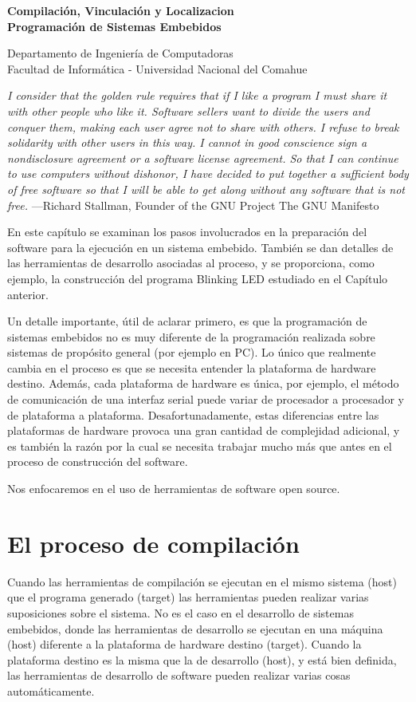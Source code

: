 \documentclass[12pt]{article}
\def\maketitle{

 \makeatletter
 {\color{bl} \centering \huge \sc \textbf{
 Compilación, Vinculación y Localizacion\\ 
\large \vspace*{-8pt} \color{black} Programación de Sistemas Embebidos
 \vspace*{8pt} }\par}
 \makeatother


 \makeatletter
 {\centering \small 
 	Departamento de Ingeniería de Computadoras \\
 	Facultad de Informática - Universidad Nacional del Comahue \\
 	\vspace{20pt} }
 \makeatother

}
\begin{document}
\thispagestyle{empty}
\maketitle
\setlength{\parindent}{0pt}

{\it I consider that the golden rule requires that if I like a program I must share it with other people who like
it. Software sellers want to divide the users and conquer them, making each user agree not to share with
others. I refuse to break solidarity with other users in this way. I cannot in good conscience sign a
nondisclosure agreement or a software license agreement. So that I can continue to use computers
without dishonor, I have decided to put together a sufficient body of free software so that I will be able
to get along without any software that is not free.}
—Richard Stallman, Founder of the GNU Project The GNU Manifesto


En este capítulo se examinan los pasos involucrados en la preparación
del software para la ejecución en un sistema embebido.
También se dan detalles de las herramientas de desarrollo asociadas
al proceso, y se proporciona, como ejemplo, la
construcción del programa Blinking LED estudiado en el Capítulo anterior.

Un detalle importante, útil de aclarar primero, es que la programación
de sistemas embebidos no es muy diferente de la programación
realizada sobre sistemas de propósito general (por ejemplo en PC).
Lo único que realmente cambia en el proceso es que se necesita 
entender la plataforma de hardware destino. Además, cada 
plataforma de hardware es única, por ejemplo, el método de comunicación
de una interfaz serial puede variar de procesador a procesador y de plataforma
a plataforma.
Desafortunadamente, estas diferencias entre las plataformas de hardware
provoca una gran cantidad de complejidad adicional, y es también la razón
por la cual se necesita trabajar mucho más que antes en el proceso de construcción
del software.

Nos enfocaremos en el uso de herramientas de software open source.


\section *{El proceso de compilación}

Cuando las herramientas de compilación se ejecutan en el mismo sistema (host)
que el programa generado (target) las herramientas pueden realizar
varias suposiciones sobre el sistema.
No es el caso en el desarrollo de sistemas embebidos, donde las herramientas
de desarrollo se ejecutan en una máquina (host) diferente a la plataforma
de hardware destino (target).
Cuando la plataforma destino es la misma que la de desarrollo (host), y está
bien definida, las herramientas de
desarrollo de software pueden realizar varias cosas automáticamente.
 
\end{document}
